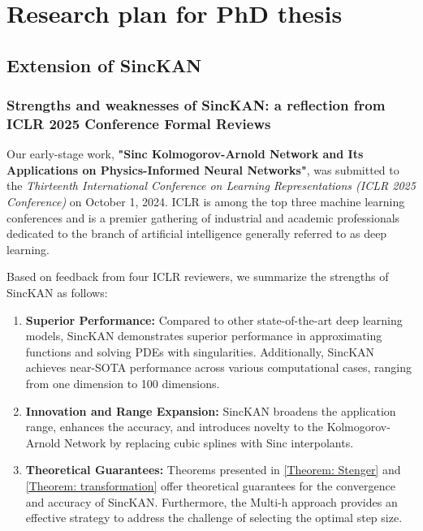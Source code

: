 
\chapter{Research plan for PhD thesis}

\section{Extension of SincKAN}

\subsection{Strengths and weaknesses of SincKAN: a reflection from ICLR 2025 Conference Formal Reviews}

Our early-stage work, \textbf{"Sinc Kolmogorov-Arnold Network and Its Applications on Physics-Informed Neural Networks"}, was submitted to the \textit{Thirteenth International Conference on Learning Representations (ICLR 2025 Conference)} on October 1, 2024. ICLR is among the top three machine learning conferences and is a premier gathering of industrial and academic professionals dedicated to the branch of artificial intelligence generally referred to as deep learning.

Based on feedback from four ICLR reviewers, we summarize the strengths of SincKAN as follows:
\begin{enumerate}
    \item \textbf{Superior Performance:} Compared to other state-of-the-art deep learning models, SincKAN demonstrates superior performance in approximating functions and solving PDEs with singularities. Additionally, SincKAN achieves near-SOTA performance across various computational cases, ranging from one dimension to 100 dimensions.
    \item \textbf{Innovation and Range Expansion:} SincKAN broadens the application range, enhances the accuracy, and introduces novelty to the Kolmogorov-Arnold Network by replacing cubic splines with Sinc interpolants.
    \item \textbf{Theoretical Guarantees:} Theorems presented in \cref{Theorem: Stenger} and \cref{Theorem: transformation} offer theoretical guarantees for the convergence and accuracy of SincKAN. Furthermore, the Multi-h approach provides an effective strategy to address the challenge of selecting the optimal step size.

\end{enumerate}

